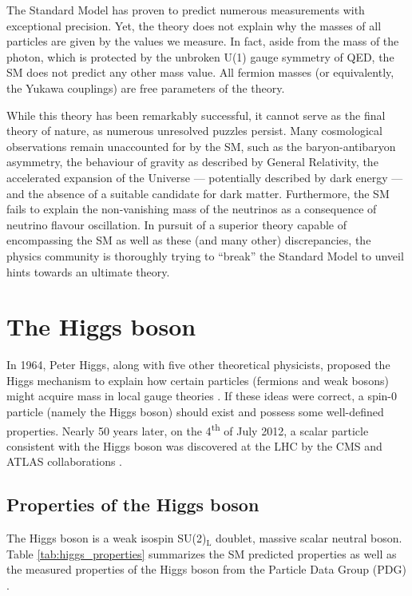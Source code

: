 The Standard Model has proven to predict numerous measurements with exceptional precision. Yet, the theory does not explain why the masses of all particles are given by the values we measure. In fact, aside from the mass of the photon, which is protected by the unbroken U(1) gauge symmetry of QED, the SM does not predict any other mass value. All fermion masses (or equivalently, the Yukawa couplings) are free parameters of the theory.

While this theory has been remarkably successful, it cannot serve as the final theory of nature, as numerous unresolved puzzles persist. Many cosmological observations remain unaccounted for by the SM, such as the baryon-antibaryon asymmetry, the behaviour of gravity as described by General Relativity, the accelerated expansion of the Universe — potentially described by dark energy — and the absence of a suitable candidate for dark matter. Furthermore, the SM fails to explain the non-vanishing mass of the neutrinos as a consequence of neutrino flavour oscillation. In pursuit of a superior theory capable of encompassing the SM as well as these (and many other) discrepancies, the physics community is thoroughly trying to ``break'' the Standard Model to unveil hints towards an ultimate theory.

\section{The Higgs boson}\label{sec:Higgs_boson}

In 1964, Peter Higgs, along with five other theoretical physicists, proposed the Higgs mechanism to explain how certain particles (fermions and weak bosons) might acquire mass in local gauge theories \cite{Higgs:1964pj,Englert:1964et,Guralnik:1964eu}. If these ideas were correct, a spin-0 particle (namely the Higgs boson) should exist and possess some well-defined properties. Nearly 50 years later, on the 4\textsuperscript{th} of July 2012, a scalar particle consistent with the Higgs boson was discovered at the LHC by the CMS and ATLAS collaborations \cite{CMS:2012qbp,ATLAS:2012yve}.

\subsection{Properties of the Higgs boson}

The Higgs boson is a weak isospin SU(2)$_{\text{L}}$ doublet, massive scalar neutral boson. Table \ref{tab:higgs_properties} summarizes the SM predicted properties \cite{Djouadi:2005gi, LHCHiggsCrossSectionWorkingGroup:2016ypw} as well as the measured properties of the Higgs boson from the Particle Data Group (PDG) \cite{PDG}.


